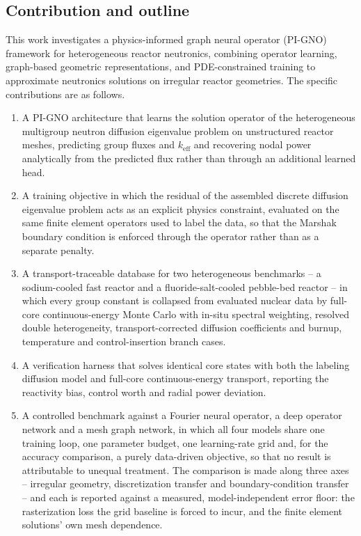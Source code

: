 \documentclass[preprint,12pt]{elsarticle}
\newcommand{\keff}{k_{\mathrm{eff}}}
\begin{document}
\subsection{Contribution and outline}
\label{sec:contribution}

This work investigates a physics-informed graph neural operator (PI-GNO)
framework for heterogeneous reactor neutronics, combining operator learning,
graph-based geometric representations, and PDE-constrained training to
approximate neutronics solutions on irregular reactor geometries. The specific
contributions are as follows.

\begin{enumerate}
\item A PI-GNO architecture that learns the solution operator of the
      heterogeneous multigroup neutron diffusion eigenvalue problem on
      unstructured reactor meshes, predicting group fluxes and $\keff$ and
      recovering nodal power analytically from the predicted flux rather than
      through an additional learned head.
\item A training objective in which the residual of the assembled discrete
      diffusion eigenvalue problem acts as an explicit physics constraint,
      evaluated on the same finite element operators used to label the data, so
      that the Marshak boundary condition is enforced through the operator
      rather than as a separate penalty.
\item A transport-traceable database for two heterogeneous benchmarks -- a
      sodium-cooled fast reactor and a fluoride-salt-cooled pebble-bed reactor
      -- in which every group constant is collapsed from evaluated nuclear data
      by full-core continuous-energy Monte Carlo with in-situ spectral
      weighting, resolved double heterogeneity, transport-corrected diffusion
      coefficients and burnup, temperature and control-insertion branch cases.
\item A verification harness that solves identical core states with both the
      labeling diffusion model and full-core continuous-energy transport,
      reporting the reactivity bias, control worth and radial power deviation.
\item A controlled benchmark against a Fourier neural operator, a deep operator
      network and a mesh graph network, in which all four models share one
      training loop, one parameter budget, one learning-rate grid and, for the
      accuracy comparison, a purely data-driven objective, so that no result is
      attributable to unequal treatment. The comparison is made along three
      axes -- irregular geometry, discretization transfer and boundary-condition
      transfer -- and each is reported against a measured, model-independent
      error floor: the rasterization loss the grid baseline is forced to incur,
      and the finite element solutions' own mesh dependence.
\end{enumerate}
\end{document}
